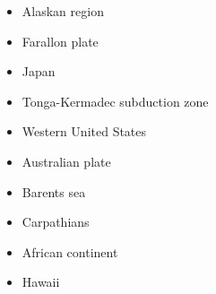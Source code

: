 \begin{itemize}
\cite{mitk07}
\cite{cort08}
\cite{kekj09}
\cite{beve10}
\cite{phcs14}
\cite{brcr17}
\cite{brcg17}
\cite{cocf19}
\item{Alaskan region} 
\cite{jabi12}
\cite{jabr13}
\cite{haja17}
\cite{mimo18}
\item{Farallon plate} 
\cite{lisg08}
\cite{list11}
\cite{list12}
\item{Japan} 
\cite{lohd07}\cite{kigk14}\cite{leli14}\cite{kilk15}
\item{Tonga-Kermadec subduction zone} 
\cite{bigs03}\cite{bigu03}
\item{Western United States}
\cite{besb06}
\item Australian plate 
\cite{himu03}\cite{wemv03}
\cite{hazs10}\cite{dimg10}
\cite{mahg11}\cite{digm11}
\item Barents sea 
\cite{buto07b}
\cite{gahs14}
\item Carpathians 
\cite{sepg19}
\item African continent 
\cite{vabt11}
\cite{busm12}
\item Hawaii 
\cite{tabs09}

\end{itemize}






